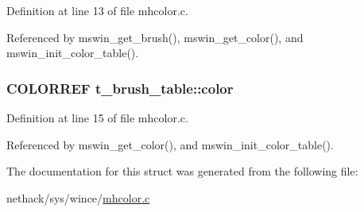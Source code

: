 Definition at line 13 of file mhcolor.\+c.



Referenced by mswin\+\_\+get\+\_\+brush(), mswin\+\_\+get\+\_\+color(), and mswin\+\_\+init\+\_\+color\+\_\+table().

\hypertarget{structt__brush__table_abd455fee406789caa678d28bd5452914}{
\subsubsection[{color}]{\setlength{\rightskip}{0pt plus 5cm}C\+O\+L\+O\+R\+R\+E\+F t\+\_\+brush\+\_\+table\+::color}}\label{structt__brush__table_abd455fee406789caa678d28bd5452914}


Definition at line 15 of file mhcolor.\+c.



Referenced by mswin\+\_\+get\+\_\+color(), and mswin\+\_\+init\+\_\+color\+\_\+table().



The documentation for this struct was generated from the following file\+:\begin{DoxyCompactItemize}
\item 
nethack/sys/wince/\hyperlink{mhcolor_8c}{mhcolor.\+c}\end{DoxyCompactItemize}
